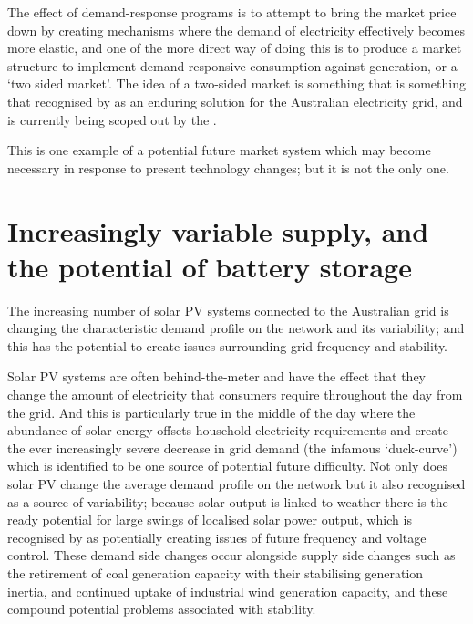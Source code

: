 The effect of demand-response programs is to attempt to bring the market price down by creating mechanisms where the demand of electricity effectively becomes more elastic, and one of the more direct way of doing this is to produce a market structure to implement demand-responsive consumption against generation, or a `two sided market'.
The idea of a two-sided market is something that is something that recognised by \cite{australianenergymarketcommission2020} as an enduring solution for the Australian electricity grid, and is currently being scoped out by the \cite{energysecurityboard2020}.

This is one example of a potential future market system which may become necessary in response to present technology changes; but it is not the only one.

\section{Increasingly variable supply, and the potential of battery storage}

The increasing number of solar PV systems connected to the Australian grid is changing the characteristic demand profile on the network and its variability; and this has the potential to create issues surrounding grid frequency and stability.

Solar PV systems are often behind-the-meter and have the effect that they change the amount of electricity that consumers require throughout the day from the grid.
And this is particularly true in the middle of the day where the abundance of solar energy offsets household electricity requirements and create the ever increasingly severe decrease in grid demand (the infamous `duck-curve') which is identified to be one source of potential future difficulty.
Not only does solar PV change the average demand profile on the network but it also recognised as a source of variability; because solar output is linked to weather there is the ready potential for large swings of localised solar power output, which is recognised by \cite{australianenergymarketoperatorlimited2018} as potentially creating issues of future frequency and voltage control.
These demand side changes occur alongside supply side changes such as the retirement of coal generation capacity with their stabilising generation inertia, and continued uptake of industrial wind generation capacity, and these compound potential problems associated with stability.

